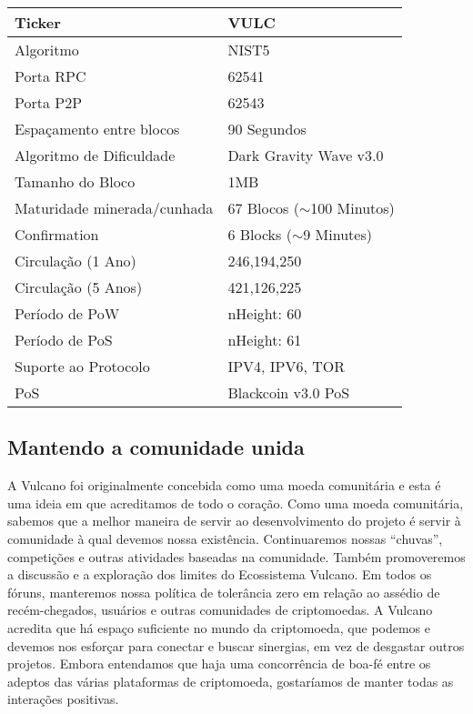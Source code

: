 \documentclass[A4paper, 12pt]{article}
\begin{document}
\begin{table}[h]
\centering
\begin{tabular}{@{}ll@{}}
\toprule
Ticker & VULC \\ \midrule
Algoritmo & NIST5 \\
Porta RPC & 62541 \\
Porta P2P & 62543 \\
Espaçamento entre blocos & 90 Segundos \\
Algoritmo de Dificuldade & Dark Gravity Wave v3.0 \\
Tamanho do Bloco & 1MB \\
Maturidade minerada/cunhada & 67 Blocos ($\sim$100 Minutos) \\
Confirmation & 6 Blocks ($\sim$9 Minutes) \\
Circulação (1 Ano) & 246,194,250 \\
Circulação (5 Anos) & 421,126,225 \\
Período de PoW & nHeight: 60 \\
Período de PoS & nHeight: 61 \\
Suporte ao Protocolo & IPV4, IPV6, TOR \\
PoS & Blackcoin v3.0 PoS \\ \bottomrule
\end{tabular}
\end{table}

\subsection{Mantendo a comunidade unida}
A Vulcano foi originalmente concebida como uma moeda comunitária e esta é uma ideia em que acreditamos de todo o coração. Como uma moeda comunitária, sabemos que a melhor maneira de servir ao desenvolvimento do projeto é servir à comunidade à qual devemos nossa existência. Continuaremos nossas “chuvas”, competições e outras atividades baseadas na comunidade. Também promoveremos a discussão e a exploração dos limites do Ecossistema Vulcano. Em todos os fóruns, manteremos nossa política de tolerância zero em relação ao assédio de recém-chegados, usuários e outras comunidades de criptomoedas. A Vulcano acredita que há espaço suficiente no mundo da criptomoeda, que podemos e devemos nos esforçar para conectar e buscar sinergias, em vez de desgastar outros projetos. Embora entendamos que haja uma concorrência de boa-fé entre os adeptos das várias plataformas de criptomoeda, gostaríamos de manter todas as interações positivas.
\end{document}
